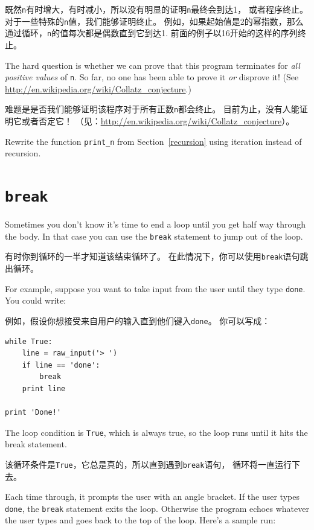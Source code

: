 \documentclass[10pt]{book}
\begin{document}
\begin{CJK}{UTF8}{gbsn}
既然{\tt n}有时增大，有时减小，所以没有明显的证明{\tt n}最终会到达1，
或者程序终止。对于一些特殊的{\tt n}值，我们能够证明终止。
例如，如果起始值是2的幂指数，那么通过循环，{\tt n}的值每次都是偶数直到它到达1.
前面的例子以16开始的这样的序列终止。

The hard question is whether we can prove that this program terminates
for {\em all positive values} of {\tt n}.  So far, no one has
been able to prove it {\em or} disprove it!  (See
  \url{http://en.wikipedia.org/wiki/Collatz_conjecture}.)
  
难题是是否我们能够证明该程序对于所有正数{\tt n}都会终止。
目前为止，没有人能证明它或者否定它！
（见：\url{http://en.wikipedia.org/wiki/Collatz_conjecture}）。

\begin{exercise}

Rewrite the function \verb"print_n" from
Section~\ref{recursion} using iteration instead of recursion.

\end{exercise}


\section{{\tt break}}

Sometimes you don't know it's time to end a loop until you get half
way through the body.  In that case you can use the {\tt break}
statement to jump out of the loop.

有时你到循环的一半才知道该结束循环了。
在此情况下，你可以使用{\tt break}语句跳出循环。

For example, suppose you want to take input from the user until they
type {\tt done}.  You could write:

例如，假设你想接受来自用户的输入直到他们键入{\tt done}。
你可以写成：

\begin{verbatim}
while True:
    line = raw_input('> ')
    if line == 'done':
        break
    print line

print 'Done!'
\end{verbatim}
%
The loop condition is {\tt True}, which is always true, so the
loop runs until it hits the break statement.

该循环条件是{\tt True}，它总是真的，所以直到遇到{\tt break}语句，
循环将一直运行下去。

Each time through, it prompts the user with an angle bracket.
If the user types {\tt done}, the {\tt break} statement exits
the loop.  Otherwise the program echoes whatever the user types
and goes back to the top of the loop.  Here's a sample run:


\end{CJK}
\end{document}
